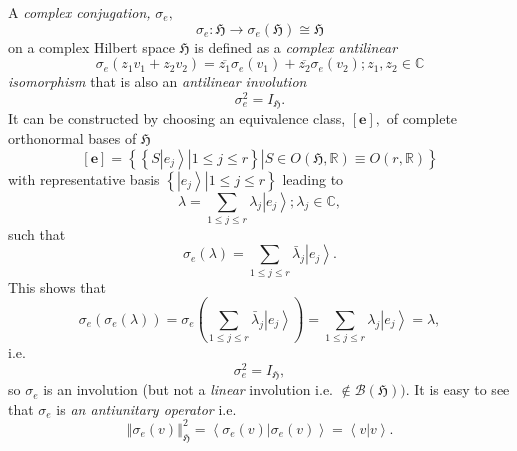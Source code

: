 \documentclass[aps,preprint]{revtex4}
\begin{document}
A \emph{complex conjugation, }$\sigma _{e},$ 
\begin{equation}
\sigma _{e}:\mathfrak{H}\rightarrow \sigma _{e}\left( \mathfrak{H}\right)
\cong \mathfrak{H}
\end{equation}%
on a complex Hilbert space $\mathfrak{H}$ is defined as a \emph{complex
antilinear} 
\begin{equation}
\sigma _{e}\left( z_{1}v_{1}+z_{2}v_{2}\right) =\overline{z_{1}}\sigma
_{e}\left( v_{1}\right) +\overline{z_{2}}\sigma _{e}\left( v_{2}\right)
;z_{1},z_{2}\in \mathbb{C}
\end{equation}%
\emph{isomorphism} that is also an \emph{antilinear involution} 
\begin{equation}
\sigma _{e}^{2}=I_{\mathfrak{H}}.
\end{equation}%
It can be constructed by choosing an equivalence class, $\left[ \mathbf{e}%
\right] ,$ of complete orthonormal bases of $\mathfrak{H}$%
\begin{equation}
\left[ \mathbf{e}\right] =\left\{ \left. \left\{ \left. S\left\vert
e_{j}\right\rangle \right\vert 1\leq j\leq r\right\} \right\vert S\in
O\left( \mathfrak{H,}\mathbb{R}\right) \equiv O\left( r,\mathbb{R}\right)
\right\}
\end{equation}%
with representative basis $\left\{ \left. \left\vert e_{j}\right\rangle
\right\vert 1\leq j\leq r\right\} $ leading to 
\begin{equation}
\lambda =\sum_{1\leq j\leq r}\lambda _{j}\left\vert e_{j}\right\rangle
;\lambda _{j}\in \mathbb{C},
\end{equation}%
such that 
\begin{equation}
\sigma _{e}\left( \lambda \right) =\sum_{1\leq j\leq r}\bar{\lambda}%
_{j}\left\vert e_{j}\right\rangle .
\end{equation}%
This shows that 
\begin{equation}
\sigma _{e}\left( \sigma _{e}\left( \lambda \right) \right) =\sigma
_{e}\left( \sum_{1\leq j\leq r}\bar{\lambda}_{j}\left\vert
e_{j}\right\rangle \right) =\sum_{1\leq j\leq r}\lambda _{j}\left\vert
e_{j}\right\rangle =\lambda ,
\end{equation}%
i.e. 
\begin{equation}
\sigma _{e}^{2}=I_{\mathfrak{H}},
\end{equation}%
so $\sigma _{e}$ is an involution (but not a \emph{linear} involution i.e. $%
\notin \mathcal{B}\left( \mathfrak{H}\right) )$. It is easy to see that $%
\sigma _{e}$ is \emph{an antiunitary operator} i.e. 
\begin{equation}
\left\Vert \sigma _{e}\left( v\right) \right\Vert _{\mathfrak{H}%
}^{2}=\left\langle \left. \sigma _{e}\left( v\right) \right\vert \sigma
_{e}\left( v\right) \right\rangle =\left\langle \left. v\right\vert
v\right\rangle .
\end{equation}%
\end{document}
